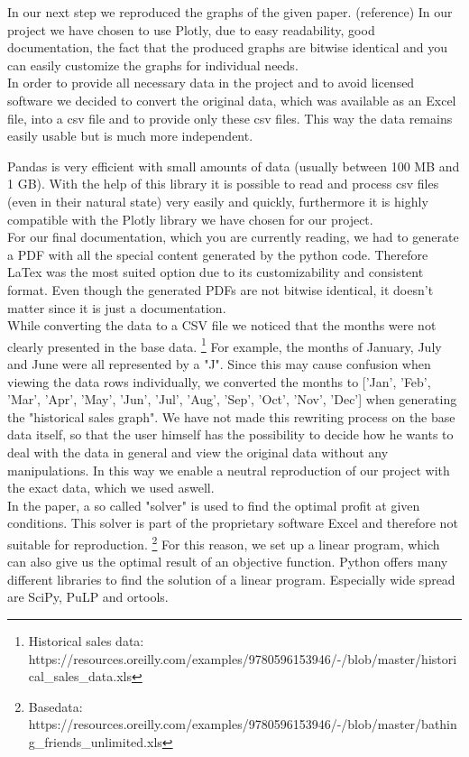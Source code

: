 \documentclass[11pt]{article}
\newenvironment{textbody}{\normalsize}\par
\begin{document}
\begin{textbody}
In our next step we reproduced the graphs of the given paper. (reference) In our project we have chosen to use Plotly, due to easy readability, good documentation, the fact that the produced graphs are bitwise identical and you can easily customize the graphs for individual needs. \\


In order to provide all necessary data in the project and to avoid licensed software we decided to convert the original data, which was available as an Excel file, into a csv file and to provide only these csv files. This way the data remains easily usable but is much more independent.

Pandas is very efficient with small amounts of data (usually between 100 MB and 1 GB). With the help of this library it is possible to read and process csv files (even in their natural state) very easily and quickly, furthermore it is highly compatible with the Plotly library we have chosen for our project. \\

For our final documentation, which you are currently reading, we had to generate a PDF with all the special content generated by the python code. Therefore LaTex was the most suited option due to its customizability and consistent format. Even though the generated PDFs are not bitwise identical, it doesn’t matter since it is just a documentation. \\

While converting the data to a CSV file we noticed that the months were not clearly presented in the base data. \footnote{Historical sales data: https://resources.oreilly.com/examples/9780596153946/-/blob/master/historical\_sales\_data.xls} For example, the months of January, July and June were all represented by a "J". Since this may cause confusion when viewing the data rows individually, we converted the months to ['Jan', 'Feb', 'Mar', 'Apr', 'May', 'Jun', 'Jul', 'Aug', 'Sep', 'Oct', 'Nov', 'Dec'] when generating the "historical sales graph". We have not made this rewriting process on the base data itself, so that the user himself has the possibility to decide how he wants to deal with the data in general and view the original data without any manipulations. In this way we enable a neutral reproduction of our project with the exact data, which we used aswell. \\

In the paper, a so called "solver" is used to find the optimal profit at given conditions. This solver is part of the proprietary software Excel and therefore not suitable for reproduction. \footnote{Basedata: https://resources.oreilly.com/examples/9780596153946/-/blob/master/bathing\_friends\_unlimited.xls} For this reason, we set up a linear program, which can also give us the optimal result of an objective function. Python offers many different libraries to find the solution of a linear program. Especially wide spread are SciPy, PuLP and ortools.


\end{textbody}
\end{document}
